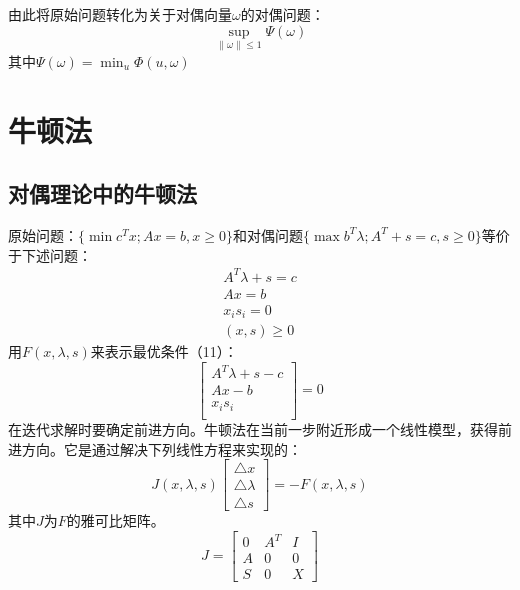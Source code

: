 \documentclass[a4paper,12pt]{article}
\begin{document}
由此将原始问题转化为关于对偶向量$\omega$的对偶问题：
\begin{equation}
\sup_{\parallel \omega \parallel \le 1} \Psi(\omega)
\end{equation}
其中$\Psi(\omega)=\min_u \Phi(u,\omega)$
\newline
\newline
\section{牛顿法}
\subsection{对偶理论中的牛顿法}
原始问题：$\{\min  c^{T}x;Ax=b, x\ge 0\}$和对偶问题$\{\max b^{T}\lambda;A^{T}+s=c, s\ge 0\}$等价于下述问题：
\begin{equation}
\begin{array}{c}
A^{T}\lambda+s=c\\
Ax=b\\
x_is_i=0\\
(x,s)\ge 0
\end{array}
\end{equation}
用$F(x,\lambda,s)$来表示最优条件（11）：
\begin{equation}
\left[
\begin{array}{c}
A^{T}\lambda+s-c\\
Ax-b\\
x_is_i\\
\end{array}
\right]
=0
\end{equation}
在迭代求解时要确定前进方向。牛顿法在当前一步附近形成一个线性模型，获得前进方向。它是通过解决下列线性方程来实现的：
\begin{equation}
J(x,\lambda,s)
\left[
\begin{array}{c}
\bigtriangleup x\\
\bigtriangleup \lambda\\
\bigtriangleup s
\end{array}
\right]
=
-F(x,\lambda,s)
\end{equation}
其中$J$为$F$的雅可比矩阵。
\begin{equation}
J=
\left[
\begin{array}{ccc}
0 & A^T & I\\
A & 0 & 0\\
S & 0 & X
\end{array}
\right]
\end{equation}
\end{document}
